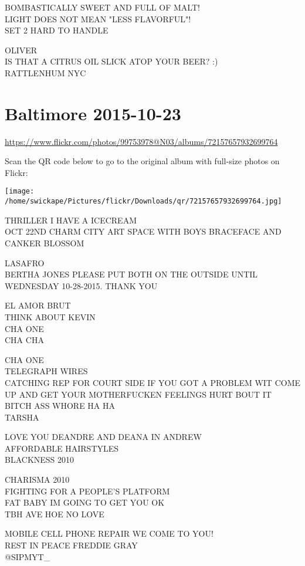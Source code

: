 \documentclass[10pt,letterpaper]{article}
\begin{document}
BOMBASTICALLY SWEET AND FULL OF MALT!\\
LIGHT DOES NOT MEAN "LESS FLAVORFUL"!\\
SET 2 HARD TO HANDLE

OLIVER\\
IS THAT A CITRUS OIL SLICK ATOP YOUR BEER? :)\\
RATTLENHUM NYC
\pagebreak

\section*{Baltimore 2015-10-23}

\url{https://www.flickr.com/photos/99753978@N03/albums/72157657932699764}

Scan the QR code below to go to the original album with full-size photos on Flickr:

\texttt{[image: /home/swickape/Pictures/flickr/Downloads/qr/72157657932699764.jpg]}
\pagebreak

THRILLER I HAVE A ICECREAM\\
OCT 22ND CHARM CITY ART SPACE WITH BOYS BRACEFACE AND CANKER BLOSSOM

LASAFRO\\
BERTHA JONES PLEASE PUT BOTH ON THE OUTSIDE UNTIL WEDNESDAY 10{-}28{-}2015.  THANK YOU

EL AMOR BRUT\\
THINK ABOUT KEVIN\\
CHA ONE\\
CHA CHA

CHA ONE\\
TELEGRAPH WIRES\\
CATCHING REP FOR COURT SIDE IF YOU GOT A PROBLEM WIT COME UP AND GET YOUR MOTHERFUCKEN FEELINGS HURT BOUT IT BITCH ASS WHORE HA HA\\
TARSHA

LOVE YOU DEANDRE AND DEANA IN ANDREW\\
AFFORDABLE HAIRSTYLES\\
BLACKNESS 2010

CHARISMA 2010\\
FIGHTING FOR A PEOPLE'S PLATFORM\\
FAT BABY IM GOING TO GET YOU OK\\
TBH AVE HOE NO LOVE

MOBILE CELL PHONE REPAIR WE COME TO YOU!\\
REST IN PEACE FREDDIE GRAY\\
@SIPMYT\_
\end{document}
